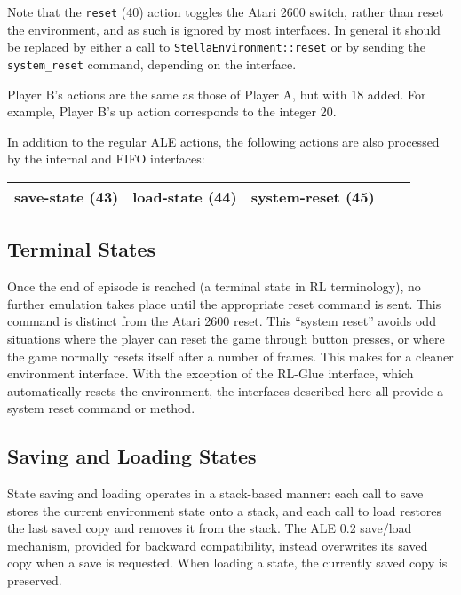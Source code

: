 \documentclass[12pt]{article}
\begin{document}
Note that the \verb+reset+ (40) action toggles the Atari 2600 switch, rather than reset the 
environment, and as such is ignored by most interfaces.
In general it should be replaced by either a call to \verb+StellaEnvironment::reset+ or by
sending the \verb+system_reset+ command, depending on the interface. 

Player B's actions are the same as those of Player A, but with 18 added. For example, Player B's
up action corresponds to the integer 20.

In addition to the regular ALE actions, the following actions are also processed by the 
internal and FIFO interfaces:

\begin{center}
\begin{tabular}{|r|r|r|r|r|}
\hline
save-state (43) & load-state (44) & system-reset (45) \\
\hline
\end{tabular}
\end{center}

\subsection{Terminal States}

Once the end of episode is reached (a terminal state in RL terminology), no further emulation 
takes place until the appropriate reset command is sent. This command is distinct from the Atari 
2600 reset. This ``system reset'' avoids odd situations where the player can reset the game
through button presses, or where the game normally resets itself after a number of frames. This 
makes for a cleaner environment interface. With the exception of the RL-Glue interface, which 
automatically resets the environment, the interfaces described here all provide a system reset
command or method.

\subsection{Saving and Loading States}

State saving and loading operates in a stack-based manner: each call to save stores the current
environment state onto a stack, and each call to load restores the last saved copy and removes
it from the stack. The ALE 0.2 save/load mechanism, provided for backward compatibility, instead
overwrites its saved copy when a save is requested. When loading a state, the currently saved copy
is preserved.
\end{document}
